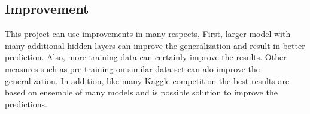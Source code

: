 \documentclass{article}
\begin{document}
    \subsection{Improvement}
    This project can use improvements in many respects, First, larger model with many additional hidden layers can improve the generalization and result in better prediction. Also, more training data can certainly improve the results. Other measures such as pre-training on similar data set can alo improve the generalization. In addition, like many Kaggle competition the best results are based on ensemble of many models and is possible solution to improve the predictions.




\end{document}
